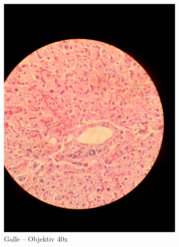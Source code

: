 \begin{figure}[h!]
\begin{subfigure}[b]{0.3\textwidth}
		\includegraphics[width=1\textwidth]{../images/08_human_liver.jpg}
		\caption{Galle -- Objektiv 40x}
	\end{subfigure}
	\begin{subfigure}[b]{0.3\textwidth}

\end{subfigure}
\end{figure}

